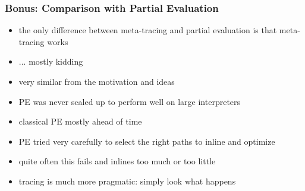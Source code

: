 \documentclass[utf8x]{beamer}
\begin{document}
\begin{frame}[label=PE]
  \frametitle{Bonus: Comparison with Partial Evaluation}
  \begin{itemize}
      \pause
      \item the only difference between meta-tracing and partial evaluation is that meta-tracing works
      \pause
      \item ... mostly kidding
      \pause
      \item very similar from the motivation and ideas
      \item PE was never scaled up to perform well on large interpreters
      \item classical PE mostly ahead of time
      \item PE tried very carefully to select the right paths to inline and optimize
      \item quite often this fails and inlines too much or too little
      \item tracing is much more pragmatic: simply look what happens
  \end{itemize}
\end{frame}
\end{document}
